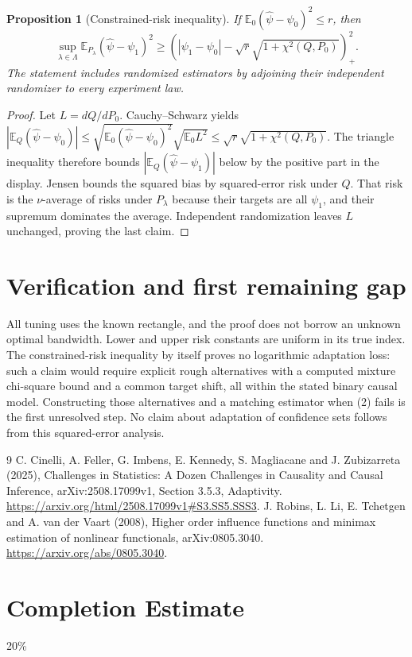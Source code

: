 \documentclass[11pt]{article}
\newtheorem{proposition}[theorem]{Proposition}
\theoremstyle{remark}
\newcommand{\E}{\mathbb E}
\begin{document}
\begin{proposition}[Constrained-risk inequality]
If $\E_0(\widehat\psi-\psi_0)^2\leq r$, then
\[
 \sup_{\lambda\in\Lambda}
 \E_{P_\lambda}(\widehat\psi-\psi_1)^2
 \geq\left(|\psi_1-\psi_0|
       -\sqrt{r}\sqrt{1+\chi^2(Q,P_0)}\right)_+^2.
\]
The statement includes randomized estimators by adjoining their
independent randomizer to every experiment law.
\end{proposition}
\begin{proof}
Let $L=dQ/dP_0$. Cauchy--Schwarz yields
$|\E_Q(\widehat\psi-\psi_0)|
\leq\sqrt{\E_0(\widehat\psi-\psi_0)^2}\sqrt{\E_0L^2}
\leq\sqrt r\sqrt{1+\chi^2(Q,P_0)}$.
The triangle inequality therefore bounds
$|\E_Q(\widehat\psi-\psi_1)|$ below by the positive part in the
display. Jensen bounds the squared bias by squared-error risk under
$Q$. That risk is the $\nu$-average of risks under $P_\lambda$ because
their targets are all $\psi_1$, and their supremum dominates the average.
Independent randomization leaves $L$ unchanged, proving the last claim.
\end{proof}

\section{Verification and first remaining gap}
All tuning uses the known rectangle, and the proof does not borrow an
unknown optimal bandwidth. Lower and upper risk constants are uniform
in its true index. The constrained-risk inequality by itself proves no
logarithmic adaptation loss: such a claim would require explicit rough
alternatives with a computed mixture chi-square bound and a common
target shift, all within the stated binary causal model. Constructing
those alternatives and a matching estimator when (2) fails is the first
unresolved step. No claim about adaptation of confidence sets follows
from this squared-error analysis.

\begin{thebibliography}{9}
 C. Cinelli, A. Feller, G. Imbens, E. Kennedy,
S. Magliacane and J. Zubizarreta (2025), Challenges in Statistics:
A Dozen Challenges in Causality and Causal Inference,
arXiv:2508.17099v1, Section 3.5.3, Adaptivity.
\url{https://arxiv.org/html/2508.17099v1#S3.SS5.SSS3}.
 J. Robins, L. Li, E. Tchetgen and A. van der Vaart (2008),
Higher order influence functions and minimax estimation of nonlinear
functionals, arXiv:0805.3040. \url{https://arxiv.org/abs/0805.3040}.
\end{thebibliography}

\section{Completion Estimate}
20\%
\end{document}

